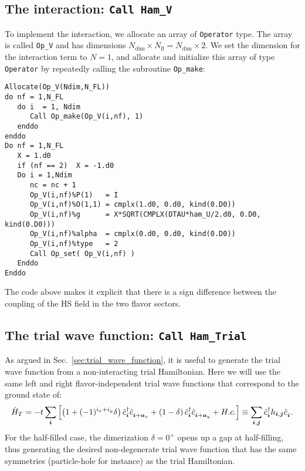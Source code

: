 \subsection{The interaction: \texttt{Call Ham\_V}}\label{U_PV_Ham_V} 
To implement  the interaction, we allocate an array of \texttt{Operator} type. The array is called  \texttt{Op\_V} and has dimensions $N_{\mathrm{dim}}\times N_{\mathrm{fl}}=N_{\mathrm{dim}} \times 2$. 
We set the dimension for the interaction term to  $N=1$, and  allocate and initialize this array of type  \texttt{Operator} by repeatedly calling the subroutine \texttt{Op\_make}: 

\begin{lstlisting}[style=fortran]
Allocate(Op_V(Ndim,N_FL))
do nf = 1,N_FL
   do i  = 1, Ndim
      Call Op_make(Op_V(i,nf), 1)
   enddo
enddo
Do nf = 1,N_FL
   X = 1.d0
   if (nf == 2)  X = -1.d0
   Do i = 1,Ndim
      nc = nc + 1
      Op_V(i,nf)%P(1)   = I
      Op_V(i,nf)%O(1,1) = cmplx(1.d0, 0.d0, kind(0.D0))
      Op_V(i,nf)%g      = X*SQRT(CMPLX(DTAU*ham_U/2.d0, 0.D0, kind(0.D0))) 
      Op_V(i,nf)%alpha  = cmplx(0.d0, 0.d0, kind(0.D0))
      Op_V(i,nf)%type   = 2
      Call Op_set( Op_V(i,nf) )
   Enddo
Enddo
\end{lstlisting}
The code above makes it explicit that there is a sign difference between the coupling of the HS field in the two flavor sectors. 

\subsection{The trial wave function: \texttt{Call Ham\_Trial}} \label{U_PV_Ham_Trial}
\label{Sec:Plain_vanilla_trial}
As  argued in Sec.~\ref{sec:trial_wave_function}, it is useful to generate the trial wave function from a non-interacting trial Hamiltonian.   Here we will  use the same left and right  flavor-independent trial wave functions that correspond to the ground state of: 
\begin{equation}
   \hat{H}_T    = - t \sum_{\ve{i}} \left[  \left( 1 + (-1)^{i_x + i_y}  \delta \right)  \hat{c}^{\dagger}_{\ve{i}}   \hat{c}^{\phantom\dagger}_{\ve{i} +\ve{a}_x}  +  
   							\left(1 - \delta \right)  \hat{c}^{\dagger}_{\ve{i}}   \hat{c}^{\phantom\dagger}_{\ve{i} +\ve{a}_y}    + H.c.  \right]   \equiv   \sum_{\ve{i},\ve{j}}  \hat{c}^{\dagger}_{\ve{i}}   h_{\ve{i},\ve{j}}  \hat{c}^{\phantom\dagger}_{\ve{i}}.
\end{equation}
For the half-filled case, the  dimerization $\delta  = 0^{+} $  opens up a gap at  half-filling,   thus generating the desired  non-degenerate  trial wave function  that has the same symmetries (particle-hole  for instance) as  the   trial  Hamiltonian.

